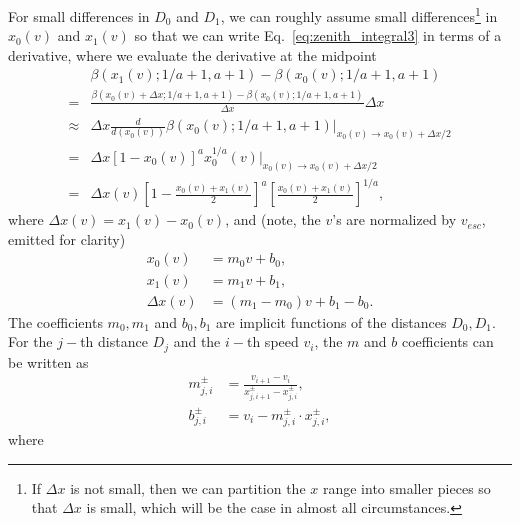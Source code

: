 \documentclass{hitec}
\begin{document}
For small differences in $D_0$ and $D_1$, we can roughly assume small differences\footnote{If $\Delta x$ is not small, then we can partition the $x$ range into smaller pieces so that $\Delta x$ is small, which will be the case in almost all circumstances.} in $x_0(v)$ and $x_1(v)$ so that we can write Eq.\ \eqref{eq:zenith_integral3} in terms of a derivative, where we evaluate the derivative at the midpoint
\begin{align}
&\beta(x_1(v); 1/a+1, a+1) - \beta(x_0(v); 1/a+1, a+1)\nonumber\\
= &\frac{\beta(x_0(v) +\Delta x; 1/a+1, a+1) - \beta(x_0(v); 1/a+1, a+1)}{\Delta x}\Delta x\nonumber\\
\approx & \Delta x\frac{d}{d(x_0(v))}\beta(x_0(v); 1/a+1, a+1)\Bigr|_{x_0(v)\to x_0(v) +\Delta x/2}\nonumber\\
=& \Delta x\left[1-x_0(v)\right]^a x_0^{1/a}(v)\Bigr|_{x_0(v)\to x_0(v) +\Delta x/2}\nonumber\\
=&\Delta x(v)\left[1-\frac{x_0(v)+x_1(v)}{2}\right]^a \left[\frac{x_0(v)+x_1(v)}{2}\right]^{1/a},
\end{align}
where $\Delta x(v) = x_1(v) - x_0(v)$, and (note, the $v$'s are normalized by $v_{esc}$, emitted for clarity)
\begin{align}
x_0(v) &= m_0 v + b_0,\\
x_1(v) &= m_1 v + b_1,\\
\Delta x(v) &= (m_1-m_0)v + b_1 - b_0.
\end{align}
The coefficients $m_0, m_1$ and $b_0, b_1$ are implicit functions of the distances $D_0, D_1$. For the $j-$th distance $D_j$ and the $i-$th speed $v_i$, the $m$ and $b$ coefficients can be written as
\begin{align}
m_{j,i}^{\pm} &= \frac{v_{i+1}-v_i}{x_{j,i+1}^{\pm}-x_{j,i}^{\pm}},\\
b_{j,i}^{\pm} &= v_i - m_{j,i}^{\pm}\cdot x_{j,i}^{\pm},
\end{align}
where
\end{document}
